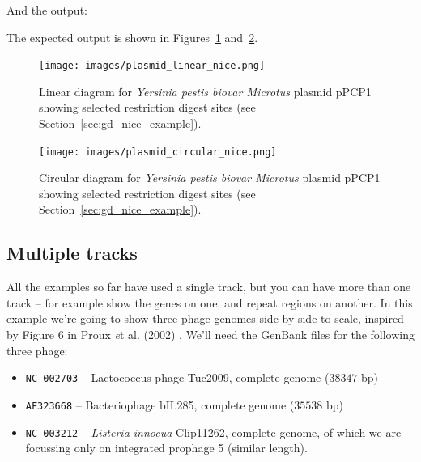 \documentclass{report}
\begin{document}
\begin{htmlonly}
\noindent And the output:



\end{htmlonly}
\begin{latexonly}
\noindent The expected output is shown in Figures~\ref{fig:plasmid_linear_nice}
and~\ref{fig:plasmid_circular_nice}.
\begin{figure}[htbp]
\centering
\texttt{[image: images/plasmid\_linear\_nice.png]}
\caption{Linear diagram for \textit{Yersinia pestis biovar Microtus} plasmid
pPCP1 showing selected restriction digest sites (see
Section~\ref{sec:gd_nice_example}).}
\label{fig:plasmid_linear_nice}
\end{figure}
\begin{figure}[htbp]
\centering
\texttt{[image: images/plasmid\_circular\_nice.png]}
\caption{Circular diagram for \textit{Yersinia pestis biovar Microtus} plasmid
pPCP1 showing selected restriction digest sites (see
Section~\ref{sec:gd_nice_example}).}
\label{fig:plasmid_circular_nice}
\end{figure}
\end{latexonly}

\subsection{Multiple tracks}
\label{sec:gd_multiple_tracks}

All the examples so far have used a single track, but you can have more than
one track -- for example show the genes on one, and repeat regions on another.
In this example we're going to show three phage genomes side by side to scale,
inspired by Figure 6 in Proux {\textit et al.} (2002) \cite{proux2002}.
We'll need the GenBank files for the following three phage:
\begin{itemize}
\item \verb|NC_002703| -- Lactococcus phage Tuc2009, complete genome ($38347$ bp)
\item \verb|AF323668| -- Bacteriophage bIL285, complete genome ($35538$ bp)
\item \verb|NC_003212| -- \textit{Listeria innocua} Clip11262, complete genome,
of which we are focussing only on integrated prophage 5 (similar length).
\end{itemize}
\end{document}
